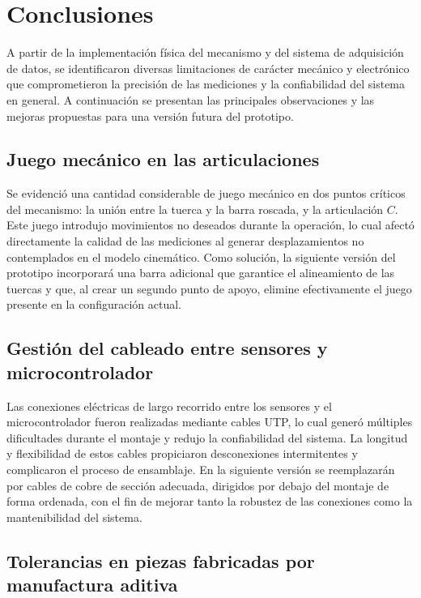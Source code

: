 \section{Conclusiones}
A partir de la implementación física del mecanismo y del sistema de adquisición
de datos, se identificaron diversas limitaciones de carácter mecánico y
electrónico que comprometieron la precisión de las mediciones y la
confiabilidad del sistema en general. A continuación se presentan las
principales observaciones y las mejoras propuestas para una versión futura del
prototipo.

\subsection*{Juego mecánico en las articulaciones}

Se evidenció una cantidad considerable de juego mecánico en dos puntos
críticos del mecanismo: la unión entre la tuerca y la barra roscada, y la
articulación $C$. Este juego introdujo movimientos no deseados durante la
operación, lo cual afectó directamente la calidad de las mediciones al generar
desplazamientos no contemplados en el modelo cinemático. Como solución, la
siguiente versión del prototipo incorporará una barra adicional que garantice
el alineamiento de las tuercas y que, al crear un segundo punto de apoyo,
elimine efectivamente el juego presente en la configuración actual.

\subsection*{Gestión del cableado entre sensores y microcontrolador}

Las conexiones eléctricas de largo recorrido entre los sensores y el
microcontrolador fueron realizadas mediante cables UTP, lo cual generó
múltiples dificultades durante el montaje y redujo la confiabilidad del
sistema. La longitud y flexibilidad de estos cables propiciaron desconexiones
intermitentes y complicaron el proceso de ensamblaje. En la siguiente versión
se reemplazarán por cables de cobre de sección adecuada, dirigidos por debajo
del montaje de forma ordenada, con el fin de mejorar tanto la robustez de las
conexiones como la mantenibilidad del sistema.

\subsection*{Tolerancias en piezas fabricadas por manufactura aditiva}

